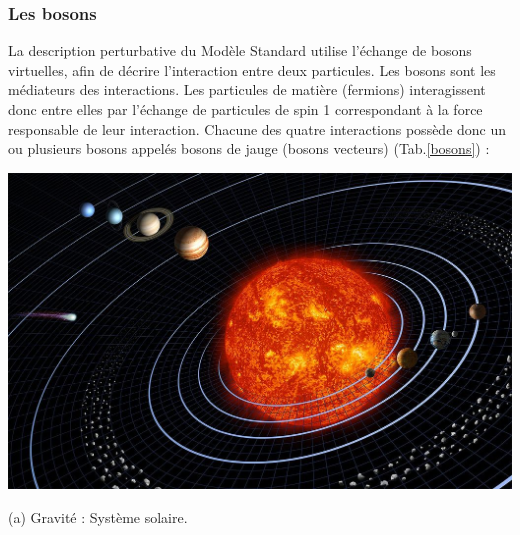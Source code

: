 \subsubsection{Les bosons}
La description perturbative du Modèle Standard utilise l'échange de bosons virtuelles, afin de décrire l'interaction entre deux particules. Les bosons sont les médiateurs des interactions. Les particules de matière (fermions) interagissent donc entre elles par l'échange de particules de spin 1 correspondant à la force responsable de leur interaction.
\smallskip
Chacune des quatre interactions possède donc un ou plusieurs bosons appelés bosons de jauge (bosons vecteurs) (Tab.\ref{bosons}) :
\marginpar
{
\begin{center}
\includegraphics[width=\marginparwidth]{SM/solaire.jpg}
\begin{center}\normalfont\small {(a) Gravité : Système solaire.}\end{center}
\end{center}
}
\marginpar
